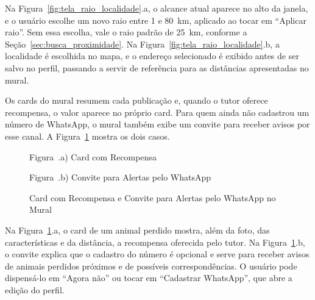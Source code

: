Na Figura~\ref{fig:tela_raio_localidade}.a, o alcance atual aparece no alto da janela, e o usuário escolhe um novo raio entre 1 e 80~km, aplicado ao tocar em ``Aplicar raio''. Sem essa escolha, vale o raio padrão de 25~km, conforme a Seção~\ref{sec:busca_proximidade}. Na Figura~\ref{fig:tela_raio_localidade}.b, a localidade é escolhida no mapa, e o endereço selecionado é exibido antes de ser salvo no perfil, passando a servir de referência para as distâncias apresentadas no mural.

Os cards do mural resumem cada publicação e, quando o tutor oferece recompensa, o valor aparece no próprio card. Para quem ainda não cadastrou um número de WhatsApp, o mural também exibe um convite para receber avisos por esse canal. A Figura~\ref{fig:tela_mural_recompensa_whatsapp} mostra os dois casos.

\begin{figure}[H]
    \centering
    \caption{Card com Recompensa e Convite para Alertas pelo WhatsApp no Mural}
    \label{fig:tela_mural_recompensa_whatsapp}
    \vspace{0.15cm}
    \begin{minipage}[t]{0.48\textwidth}
        \centering
        \par\vspace{0.12cm}
        {\small Figura~\thefigure.a) Card com Recompensa}
    \end{minipage}
    \hfill
    \begin{minipage}[t]{0.48\textwidth}
        \centering
        \par\vspace{0.12cm}
        {\small Figura~\thefigure.b) Convite para Alertas pelo WhatsApp}
    \end{minipage}
    \par\vspace{0.12cm}
\end{figure}

Na Figura~\ref{fig:tela_mural_recompensa_whatsapp}.a, o card de um animal perdido mostra, além da foto, das características e da distância, a recompensa oferecida pelo tutor. Na Figura~\ref{fig:tela_mural_recompensa_whatsapp}.b, o convite explica que o cadastro do número é opcional e serve para receber avisos de animais perdidos próximos e de possíveis correspondências. O usuário pode dispensá-lo em ``Agora não'' ou tocar em ``Cadastrar WhatsApp'', que abre a edição do perfil.

